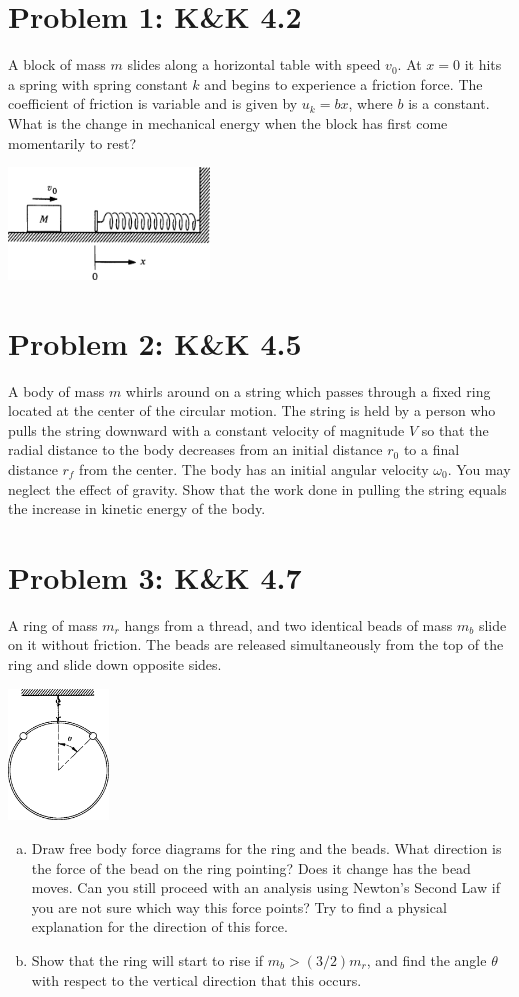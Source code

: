 \documentclass[problems]{esg8012pset}
\date{October 15}
\begin{document}
\section*{Problem 1: K\&K 4.2}
  A block of mass $m$ slides along a horizontal table with speed $v_0$. At $x = 0$ it hits a spring with spring constant $k$ and begins to experience a friction force. The coefficient of friction is variable and is given by $u_k = bx$, where $b$ is a constant. What is the change in mechanical energy when the block has first come momentarily to rest?
  \begin{center}\includegraphics[width=0.4\textwidth]{ps06_1}\end{center}
\section*{Problem 2: K\&K 4.5}
  A body of mass $m$ whirls around on a string which passes through a fixed ring located at the center of the circular motion. The string is held by a person who pulls the string downward with a constant velocity of magnitude $V$ so that the radial distance to the body decreases from an initial distance $r_0$ to a final distance $r_f$ from the center. The body has an initial angular velocity $\omega_0$. You may neglect the effect of gravity. Show that the work done in pulling the string equals the increase in kinetic energy of the body.
\section*{Problem 3: K\&K 4.7}
  A ring of mass $m_r$ hangs from a thread, and two identical beads of mass $m_b$ slide on it without friction. The beads are released simultaneously from the top of the ring and slide down opposite sides.
  \begin{center}\includegraphics[width=0.2\textwidth]{ps06_2}\end{center}
  \begin{enumerate}[(a)]
  \item Draw free body force diagrams for the ring and the beads. What direction is the force of the bead on the ring pointing? Does it change has the bead moves. Can you still proceed with an analysis using Newton's Second Law if you are not sure which way this force points? Try to find a physical explanation for the direction of this force.
    \item Show that the ring will start to rise if $m_b > (3/2)m_r$, and find the angle $\theta$ with respect to the vertical direction that this occurs.
  \end{enumerate}
\end{document}
